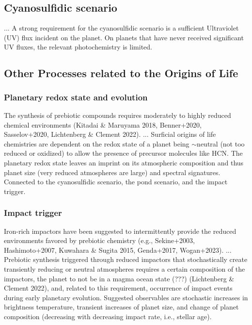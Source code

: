 \documentclass[twocolumn]{aastex631}
\begin{document}
\subsection{Cyanosulfidic scenario}
...
A strong requirement for the cyanosulfidic scenario is a sufficient Ultraviolet (UV) flux incident on the planet.
On planets that have never received significant UV fluxes, the relevant photochemistry is limited.

\subsection{Other Processes related to the Origins of Life}
\subsubsection{Planetary redox state and evolution}
The synthesis of prebiotic compounds requires moderately to highly reduced chemical environments (Kitadai \& Maruyama 2018, Benner+2020, Sasselov+2020, Lichtenberg \& Clement 2022).
...
Surficial origins of life chemistries are dependent on the redox state of a planet being $\sim$neutral (not too reduced or oxidized) to allow the presence of precursor molecules like HCN. The planetary redox state leaves an imprint on its atmospheric composition and thus planet size (very reduced atmospheres are large) and spectral signatures. Connected to the cyanosulfidic scenario, the pond scenario, and the impact trigger.

\subsubsection{Impact trigger}
Iron-rich impactors have been suggested to intermittently provide the reduced environments favored by prebiotic chemistry (e.g., Sekine+2003, Hashimoto+2007, Kuwahara \& Sugita 2015, Genda+2017, Wogan+2023).
...
Prebiotic synthesis triggered through reduced impactors that stochastically create transiently reducing or neutral atmospheres requires a certain composition of the impactors, the planet to not be in a magma ocean state (???) (Lichtenberg \& Clement 2022), and, related to this requirement, occurrence of impact events during early planetary evolution.
Suggested observables are stochastic increases in brightness temperature, transient increases of planet size, and change of planet composition (decreasing with decreasing impact rate, i.e., stellar age).


%
\end{document}
